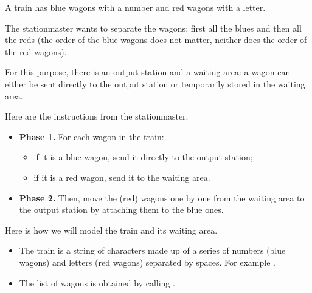 \documentclass[11pt,class=report,crop=false]{standalone}
\begin{document}
\begin{activite}




A train has blue wagons with a number and red wagons with a letter. 


The stationmaster wants to separate the wagons: first all the blues and then all the reds (the order of the blue wagons does not matter, neither does the order of the red wagons). 


For this purpose, there is an output station and a waiting area: a wagon can either be sent directly to the output station or temporarily stored in the waiting area.



Here are the instructions from the stationmaster.
\begin{itemize}

  \item \textbf{Phase 1.} For each wagon in the train:
     \begin{itemize} 
       \item if it is a blue wagon, send it directly to the output station;
       \item if it is a red wagon, send it to the waiting area.
     \end{itemize}
   
  \item \textbf{Phase 2.} Then, move the (red) wagons one by one from the waiting area to the output station by attaching them to the blue ones.
\end{itemize}  
 
 
  


Here is how we will model the train and its waiting area.
\begin{itemize}
  \item The train is a string of characters made up of a series of numbers (blue wagons) and letters (red wagons) separated by spaces. For example . 
  
  \item The list of wagons is obtained by calling .
  

\end{itemize}
\end{activite}
\end{document}
